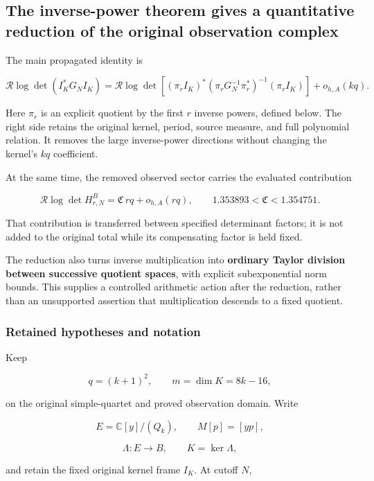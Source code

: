 \documentclass[11pt]{article}
\begin{document}
\subsection{The inverse-power theorem gives a quantitative reduction of the original observation complex}\label{the-inverse-power-theorem-gives-a-quantitative-reduction-of-the-original-observation-complex}

The main propagated identity is

\[
\boxed{
\mathcal R\log\det(I_K^*G_NI_K)
=
\mathcal R\log\det\!\left[
(\pi_rI_K)^*
(\pi_rG_N^{-1}\pi_r^*)^{-1}
(\pi_rI_K)
\right]
+o_{h,A}(kq).
}
\tag{1}
\]

Here \(\pi_r\) is an explicit quotient by the first \(r\) inverse powers, defined below. The right side retains the original kernel, period, source measure, and full polynomial relation. It removes the large inverse-power directions without changing the kernel's \(kq\) coefficient.

At the same time, the removed observed sector carries the evaluated contribution

\[
\boxed{
\mathcal R\log\det H^B_{r,N}
=
\mathfrak C\,rq+o_{h,A}(rq),
\qquad
1.353893<\mathfrak C<1.354751.
}
\tag{2}
\]

That contribution is transferred between specified determinant factors; it is not added to the original total while its compensating factor is held fixed.

The reduction also turns inverse multiplication into \textbf{ordinary Taylor division between successive quotient spaces}, with explicit subexponential norm bounds. This supplies a controlled arithmetic action after the reduction, rather than an unsupported assertion that multiplication descends to a fixed quotient.

\subsubsection{Retained hypotheses and notation}\label{retained-hypotheses-and-notation}

Keep

\[
q=(k+1)^2,\qquad m=\dim K=8k-16,
\]

on the original simple-quartet and proved observation domain. Write

\[
E=\mathbb C[y]/(Q_k),\qquad M[p]=[yp],
\]

\[
\Lambda:E\longrightarrow B,\qquad K=\ker\Lambda,
\]

and retain the fixed original kernel frame \(I_K\). At cutoff \(N\),
\end{document}
